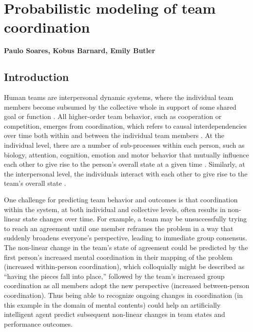 \chapter{Probabilistic modeling of team coordination}
\label{ch:pgm}
\textbf{Paulo Soares, Kobus Barnard, Emily Butler}

\section{Introduction}
Human teams are interpersonal dynamic systems, where the individual team members
become subsumed by the collective whole in support of some shared goal or
function \citep{nowak2020insync, cooke2013Ainteractive, eiler2017interaction, fusaroli2014dialog, gorman2010team, wiltshire2017problem, wiltshire2019multiscale}.
All higher-order team behavior, such as cooperation or competition, emerges from
coordination, which refers to causal interdependencies over time both within and
between the individual team members \citep{butner2014modeling}. At the individual
level, there are a number of sub-processes within each person, such as biology,
attention, cognition, emotion and motor behavior that mutually influence each
other to give rise to the person’s overall state at a given time \citep{butler2011temporal,butler2017emotions}. Similarly, at the interpersonal level, the individuals interact with each
other to give rise to the team’s overall state \citep{nowak2020insync, butler2011temporal, butler2017emotions, cooke2013Binteractive, gorman2010team, letsky2008macrocognition}.

One challenge for predicting team behavior and outcomes is that coordination
within the system, at both individual and collective levels, often results in
non-linear state changes over time. For example, a team may be unsuccessfully
trying to reach an agreement until one member reframes the problem in a way that
suddenly broadens everyone’s perspective, leading to immediate group consensus.
The non-linear change in the team’s state of agreement could be predicted by the
first person’s increased mental coordination in their mapping of the problem
(increased within-person coordination), which colloquially might be described as
“having the pieces fall into place,” followed by the team’s increased group
coordination as all members adopt the new perspective (increased between-person
coordination). Thus being able to recognize ongoing changes in coordination (in
this example in the domain of mental contents) could help an artificially
intelligent agent predict subsequent non-linear changes in team states and
performance outcomes. 

